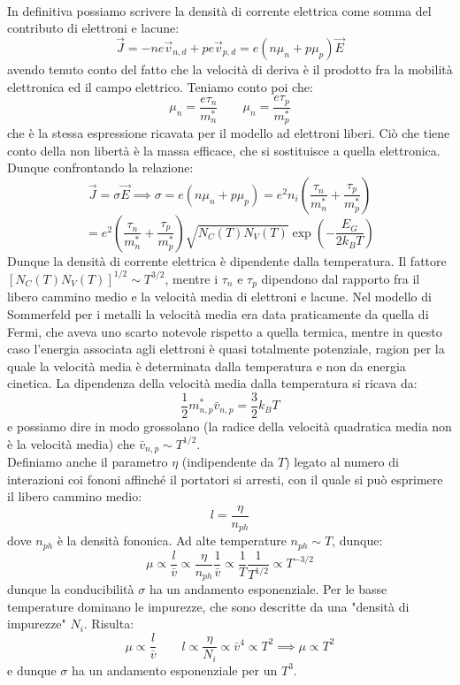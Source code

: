 \documentclass{book}
\begin{document}
         \paragraph{}
        In definitiva possiamo scrivere la densità di corrente elettrica come somma del contributo di elettroni e lacune:
        $$\vec{J} = -ne\vec{v}_{n,d} + pe\vec{v}_{p,d} = e(n\mu_{n}+p\mu_{p})\vec{E}$$
        avendo tenuto conto del fatto che la velocità di deriva è il prodotto fra la mobilità elettronica ed il campo elettrico. Teniamo conto poi che:
        $$\mu_{n} = \frac{e \tau_{n}}{m_{n} ^{*}} \quad \quad \mu_{n} = \frac{e \tau_{p}}{m_{p} ^{*}}$$
        che è la stessa espressione ricavata per il modello ad elettroni liberi. Ciò che tiene conto della non libertà è la massa efficace, che si sostituisce a quella elettronica.\\
        Dunque confrontando la relazione:
        $$\vec{J} = \sigma \vec{E} \implies \sigma = e(n\mu_{n} + p \mu_{p}) =e^{2}n_{i}(\frac{\tau_{n}}{m_{n} ^{*}}+\frac{\tau_{p}}{m_{p} ^{*}})  $$ 
        $$=e^{2}(\frac{\tau_{n}}{m_{n} ^{*}}+\frac{\tau_{p}}{m_{p} ^{*}})\sqrt{N_{C}(T)N_{V}(T)}\exp{(-\frac{E_{G}}{2k_{B}T})}$$
        Dunque la densità di corrente elettrica è dipendente dalla temperatura. Il fattore $[N_{C}(T)N_{V}(T)]^{1/2} \sim T^{3/2}$, mentre i $\tau_{n}$ e $\tau_{p}$ dipendono dal rapporto fra il libero cammino medio e la velocità media di elettroni e lacune. Nel modello di Sommerfeld per i metalli la velocità media era data praticamente da quella di Fermi, che aveva uno scarto notevole rispetto a quella termica, mentre in questo caso l'energia associata agli elettroni è quasi totalmente potenziale, ragion per la quale la velocità media è determinata dalla temperatura e non da energia cinetica.
        La dipendenza della velocità media dalla temperatura si ricava da:
        $$\frac{1}{2} m^{*}_{n,p} \bar{v}_{n,p} = \frac{3}{2}k_{B}T$$
        e possiamo dire in modo grossolano (la radice della velocità quadratica media non è la velocità media) che $\bar{v}_{n,p} \sim T^{1/2}$.\\
        Definiamo anche il parametro $\eta$ (indipendente da $T$) legato al numero di interazioni coi fononi affinché il portatori si arresti, con il quale si può esprimere il libero cammino medio:
        $$l = \frac{\eta}{n_{ph}}$$
        dove $n_{ph}$ è la densità fononica. Ad alte temperature $n_{ph} \sim T$, dunque:
        $$\mu \propto \frac{l}{\bar{v}} \propto \frac{\eta}{n_{ph}} \frac{1}{\bar{v}} \propto \frac{1}{T} \frac{1}{T^{1/2}} \propto T^{-3/2}$$
        dunque la conducibilità $\sigma$ ha un andamento esponenziale. Per le basse temperature dominano le impurezze, che sono descritte da una "densità di impurezze" $N_{i}$. Risulta:
        $$\mu \propto \frac{l}{\bar{v}} \qquad l \propto \frac{\eta}{N_{i}} \propto \bar{v}^{4} \propto T^{2} \implies \mu \propto T^{2}$$
        e dunque $\sigma$ ha un andamento esponenziale per un $T^{3}$.
        
\end{document}
